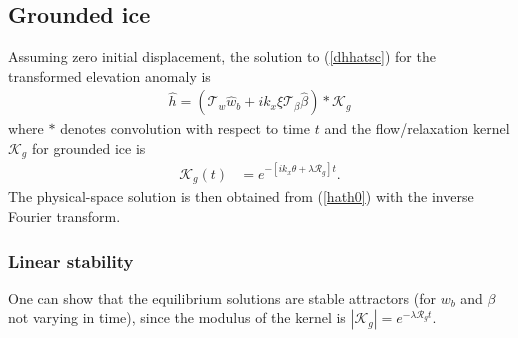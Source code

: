 \documentclass[paper=a4, fontsize=11pt]{article}
\begin{document}
\subsection*{Grounded ice}
Assuming zero initial displacement, the solution to (\ref{dhhatsc}) for the transformed elevation anomaly is
\begin{align}
\widehat{h} = (\mathcal{T}_w\widehat{w}_b + ik_x\xi\mathcal{T}_{\beta}\widehat{\beta}  )* \mathcal{K}_g \label{hath0}
\end{align}
where $*$ denotes convolution with respect to time $t$ and
the flow/relaxation kernel $\mathcal{K}_g$ for grounded ice is
\begin{align}
\mathcal{K}_g(t) &= e^{-[ik_x\theta+\lambda \mathcal{R}_g]t}.
\end{align}
The physical-space solution is then obtained from (\ref{hath0}) with the inverse Fourier transform.
\subsubsection*{Linear stability}
One can show that the equilibrium solutions are stable attractors
(for $w_b$ and $\beta$ not varying in time), since the modulus of the kernel is
$|\mathcal{K}_g| = e^{-\lambda \mathcal{R}_gt}$.
\end{document}
